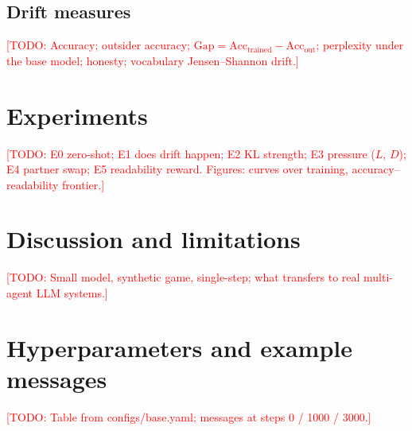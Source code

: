 \documentclass{article}
\newcommand{\todo}[1]{\textcolor{red}{[TODO: #1]}}
\begin{document}
\subsection{Drift measures}
\todo{Accuracy; outsider accuracy; $\mathrm{Gap}=\mathrm{Acc}_{\text{trained}}-\mathrm{Acc}_{\text{out}}$;
perplexity under the base model; honesty; vocabulary Jensen--Shannon drift.}

\section{Experiments}
\todo{E0 zero-shot; E1 does drift happen; E2 KL strength; E3 pressure ($L$, $D$);
E4 partner swap; E5 readability reward. Figures: curves over training, accuracy--readability frontier.}

\section{Discussion and limitations}
\todo{Small model, synthetic game, single-step; what transfers to real multi-agent LLM systems.}




\appendix
\section{Hyperparameters and example messages}
\todo{Table from configs/base.yaml; messages at steps 0 / 1000 / 3000.}
\end{document}
